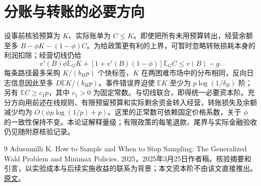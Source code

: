 \documentclass[UTF8,fontset=windows,11pt,a4paper]{ctexart}
\numberwithin{equation}{section}
\begin{document}
\section{分账与转账的必要方向}
设事前核验预算为 $K$、实际账单为 $C\le K$。即使把所有未用预算转出，经营余额至多 $B-\phi K-(1-\phi)C$。为给政策更有利的上界，可暂时忽略转账损耗本身的利润扣除；经营切线仍给
\begin{equation}
 v'(B)\phi\mathbb E_GK+
 [1+v'(B)(1-\phi)]\mathbb E_GC\le v(B)-g.
\end{equation}
每条路径最多采购 $K/(b_Hp)$ 个快标签，$K$ 在两困难市场中的分布相同，反向日志信息因此至多 $D\mathbb EK/(b_Hp)$。事件错误界迫使 $\mathbb EK$ 至少为 $p\log(1/\delta_B)$ 阶；另有 $\mathbb EC\ge c_1p$，其中 $c_1>0$ 为固定常数。与切线联合，即得统一必要资本阶。充分方向用前述在线规则、有限预留预算和实际剩余资金转入经营，转账损失及余额减少均为 $O(\phi p\log(1/p)+p)$。这里的正常数可依赖固定价格系数，关于 $\phi$ 的一致性保持不变。本论证解释量级；有限政策的每笔退款、尾界与实际金融验收仍见随附原核验记录。

\begin{thebibliography}{9}
 Adusumilli K. How to Sample and When to Stop Sampling: The Generalized Wald Problem and Minimax Policies. 2025，2025年3月25日作者稿。核验摘要和引言，以实验成本与后续实施收益的联系为背景；本文资本阶不由该文直接推出。\href{https://www.restud.com/wp-content/uploads/2025/03/Sequential_stopping_final.pdf}{原文}。
\end{thebibliography}
\end{document}
